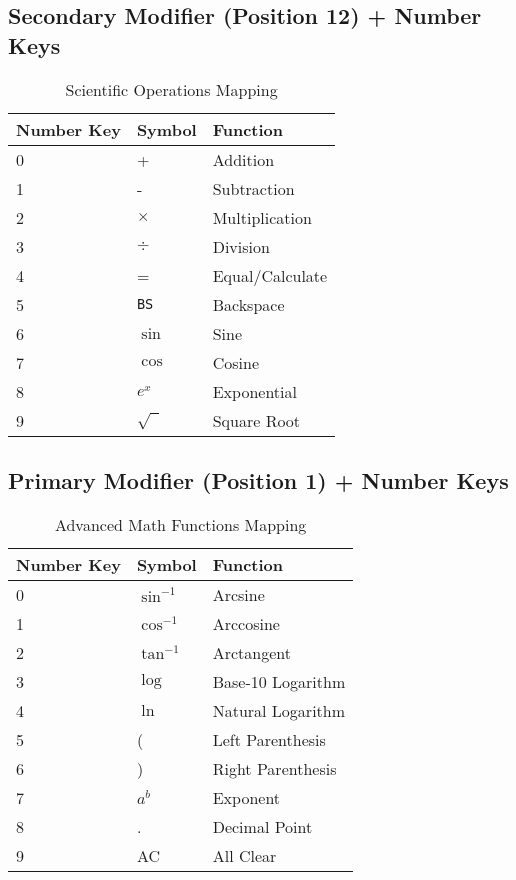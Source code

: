 \documentclass[journal]{IEEEtran}
\begin{document}
\subsection{Secondary Modifier (Position 12) + Number Keys}
\begin{table}[h!]
\centering
\caption{Scientific Operations Mapping}
\begin{tabular}{|l|l|l|}
\hline
\textbf{Number Key} & \textbf{Symbol} & \textbf{Function} \\
\hline
0 & + & Addition \\
1 & - & Subtraction \\
2 & $\times$ & Multiplication \\
3 & $\div$ & Division \\
4 & = & Equal/Calculate \\
5 & \texttt{BS} & Backspace \\
6 & $\sin$ & Sine \\
7 & $\cos$ & Cosine \\
8 & $e^x$ & Exponential \\
9 & $\sqrt{\phantom{x}}$ & Square Root \\
\hline
\end{tabular}
\end{table}

\subsection{Primary Modifier (Position 1) + Number Keys}
\begin{table}[h!]
\centering
\caption{Advanced Math Functions Mapping}
\begin{tabular}{|l|l|l|}
\hline
\textbf{Number Key} & \textbf{Symbol} & \textbf{Function} \\
\hline
0 & $\sin^{-1}$ & Arcsine \\
1 & $\cos^{-1}$ & Arccosine \\
2 & $\tan^{-1}$ & Arctangent \\
3 & $\log$ & Base-10 Logarithm \\
4 & $\ln$ & Natural Logarithm \\
5 & ( & Left Parenthesis \\
6 & ) & Right Parenthesis \\
7 & $a^b$ & Exponent \\
8 & . & Decimal Point \\
9 & AC & All Clear \\
\hline
\end{tabular}
\end{table}
\end{document}
